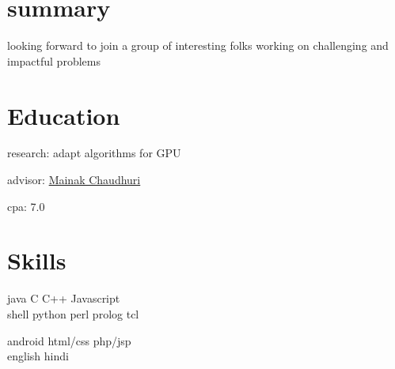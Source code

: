 
\begin{minipage}[t]{0.33\textwidth} %

\section{summary}
\location{}
looking forward to join a group of interesting folks working on challenging and impactful problems
\sectionspace %

\section{Education} 
\vspace{\topsep} %
\vspace{1pt}
\begin{tightitemize}
\item research: adapt algorithms for GPU
\item advisor: \href{https://www.cse.iitk.ac.in/users/mainakc/}{Mainak Chaudhuri} 
\item cpa: 7.0
\end{tightitemize}
\vspace{6pt}




\sectionspace %

\section{Skills}

java \textbullet{} C \textbullet{} C++ \textbullet{} Javascript\\ 
shell \textbullet{} python \textbullet{} perl \textbullet{} prolog \textbullet{} tcl\\
\sectionspace %

android \textbullet{} html/css \textbullet{} php/jsp \\
english \textbullet{} hindi\\ 


\end{minipage}

